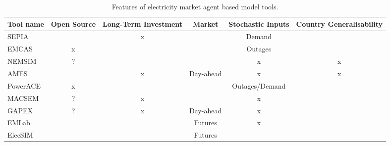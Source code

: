 \begin{table*}[]
	\begin{tabular}{|l|c|c|c|c|c|}
		\hline
		\multicolumn{1}{|c|}{\textbf{Tool name}} & \textbf{Open Source} & \textbf{Long-Term Investment} & \textbf{Market} & \textbf{Stochastic Inputs} & \textbf{Country Generalisability} \\ \hline
		SEPIA                                    & \checkmark           & x                             & \checkmark      & Demand                     & \checkmark                        \\ \hline
		EMCAS                                    & x                    & \checkmark                    & \checkmark      & Outages                    & \checkmark                        \\ \hline
		NEMSIM                                   & ?              & \checkmark                    & \checkmark      & x                          & x                                 \\ \hline
		AMES                                     & \checkmark           & x                             & Day-ahead       & x                          & x                                 \\ \hline
		PowerACE                                 & x                    & \checkmark                    & \checkmark      & Outages/Demand             & \checkmark                        \\ \hline
		MACSEM                                   & ?              & x                             & \checkmark      & x                          & \checkmark                        \\ \hline
		GAPEX                                    & ?              & x                             & Day-ahead       & x                          & \checkmark                        \\ \hline
		EMLab                                    & \checkmark           & \checkmark                    & Futures         & x                          & \checkmark                        \\ \hline
		ElecSIM                                  & \checkmark           & \checkmark                    & Futures         & \checkmark                 & \checkmark                        \\ \hline
	\end{tabular}
	\caption{Features of electricity market agent based model tools.}
	\label{table:tool_comparison}
\end{table*}


